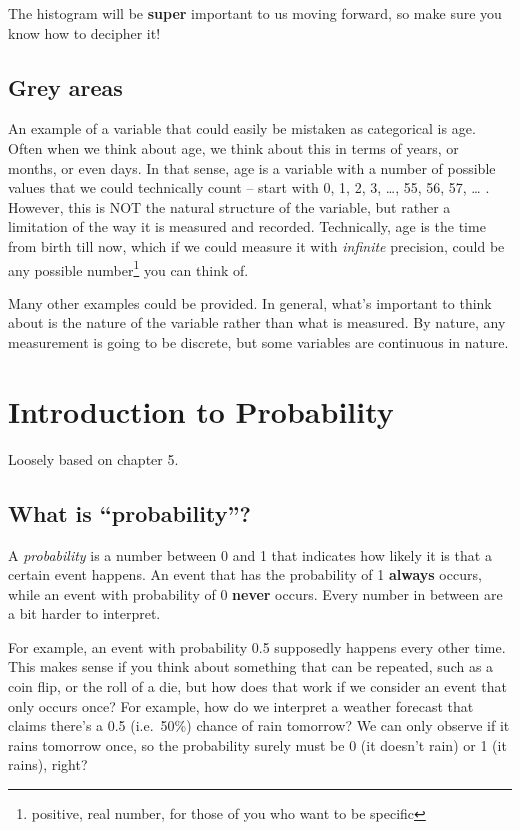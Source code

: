 \documentclass[]{book}
\let\rmarkdownfootnote\footnote%
\def\footnote{\protect\rmarkdownfootnote}
\theoremstyle{definition}
\theoremstyle{definition}
\theoremstyle{definition}
\theoremstyle{remark}
\begin{document}
The histogram will be \textbf{super} important to us moving forward, so make sure you know how to decipher it!

\hypertarget{grey-areas}{%
\chapter{Grey areas}\label{grey-areas}}

An example of a variable that could easily be mistaken as categorical is age. Often when we think about age, we think about this in terms of years, or months, or even days. In that sense, age is a variable with a number of possible values that we could technically count -- start with 0, 1, 2, 3, \ldots, 55, 56, 57, \ldots{} . However, this is NOT the natural structure of the variable, but rather a limitation of the way it is measured and recorded. Technically, age is the time from birth till now, which if we could measure it with \emph{infinite} precision, could be any possible number\footnote{positive, real number, for those of you who want to be specific} you can think of.

Many other examples could be provided. In general, what's important to think about is the nature of the variable rather than what is measured. By nature, any measurement is going to be discrete, but some variables are continuous in nature.

\hypertarget{part-introduction-to-probability}{%
\part{Introduction to Probability}\label{part-introduction-to-probability}}

Loosely based on \citet{ls} chapter 5.

\hypertarget{what-is-probability}{%
\chapter{What is ``probability''?}\label{what-is-probability}}

A \emph{probability} is a number between 0 and 1 that indicates how likely it is that a certain event happens. An event that has the probability of 1 \textbf{always} occurs, while an event with probability of 0 \textbf{never} occurs. Every number in between are a bit harder to interpret.

For example, an event with probability 0.5 supposedly happens every other time. This makes sense if you think about something that can be repeated, such as a coin flip, or the roll of a die, but how does that work if we consider an event that only occurs once? For example, how do we interpret a weather forecast that claims there's a 0.5 (i.e.~50\%) chance of rain tomorrow? We can only observe if it rains tomorrow once, so the probability surely must be 0 (it doesn't rain) or 1 (it rains), right?
\end{document}
